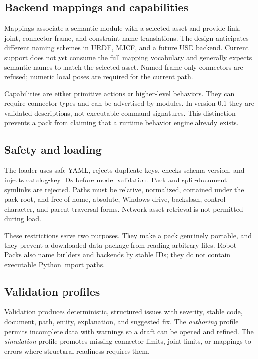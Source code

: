 \subsection{Backend mappings and capabilities}

Mappings associate a semantic module with a selected asset and provide link, joint,
connector-frame, and constraint name translations. The design anticipates different
naming schemes in URDF, MJCF, and a future USD backend. Current \mujoco{} support does
not yet consume the full mapping vocabulary and generally expects semantic names to
match the selected asset. Named-frame-only connectors are refused; numeric local poses
are required for the current path.

Capabilities are either primitive actions or higher-level behaviors. They can require
connector types and can be advertised by modules. In version 0.1 they are validated
descriptions, not executable command signatures. This distinction prevents a pack from
claiming that a runtime behavior engine already exists.

\subsection{Safety and loading}

The loader uses safe YAML, rejects duplicate keys, checks schema version, and injects
catalog-key IDs before model validation. Pack and split-document symlinks are rejected.
Paths must be relative, normalized, contained under the pack root, and free of home,
absolute, Windows-drive, backslash, control-character, and parent-traversal forms.
Network asset retrieval is not permitted during load.

These restrictions serve two purposes. They make a pack genuinely portable, and they
prevent a downloaded data package from reading arbitrary files. Robot Packs also name
builders and backends by stable IDs; they do not contain executable Python import
paths.

\subsection{Validation profiles}

Validation produces deterministic, structured issues with severity, stable code,
document, path, entity, explanation, and suggested fix. The \emph{authoring} profile
permits incomplete data with warnings so a draft can be opened and refined. The
\emph{simulation} profile promotes missing connector limits, joint limits, or mappings
to errors where structural readiness requires them.

